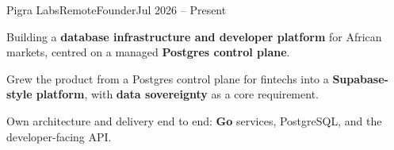 \begin{cvjob}{Pigra Labs}{Remote}{Founder}{Jul 2026 -- Present}
  \item Building a \textbf{database infrastructure and developer platform} for African markets, centred on a managed \textbf{Postgres control plane}.
  \item Grew the product from a Postgres control plane for fintechs into a \textbf{Supabase-style platform}, with \textbf{data sovereignty} as a core requirement.
  \item Own architecture and delivery end to end: \textbf{Go} services, PostgreSQL, and the developer-facing API.
\end{cvjob}

